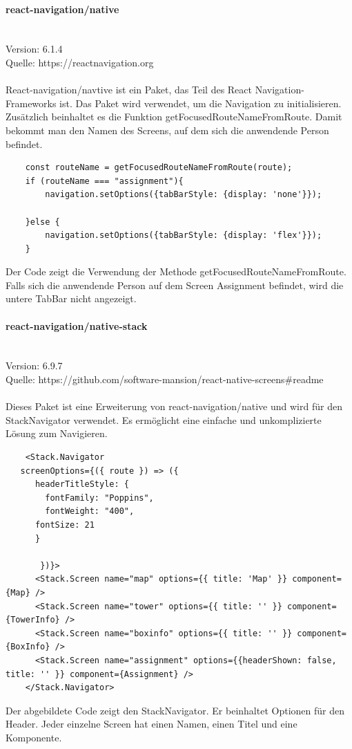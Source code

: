 \paragraph{react-navigation/native}\mbox{}\\
Version: 6.1.4\\
Quelle: https://reactnavigation.org\\ \\
React-navigation/navtive ist ein Paket, das Teil des React Navigation-Frameworks ist. Das Paket wird verwendet, um die Navigation zu initialisieren. Zusätzlich beinhaltet es die Funktion getFocusedRouteNameFromRoute. Damit bekommt man den Namen des Screens, auf dem sich die anwendende Person befindet.\\
\begin{verbatim}
    const routeName = getFocusedRouteNameFromRoute(route);
    if (routeName === "assignment"){
        navigation.setOptions({tabBarStyle: {display: 'none'}});
        
    }else {
        navigation.setOptions({tabBarStyle: {display: 'flex'}});
    }
\end{verbatim}
Der Code zeigt die Verwendung der Methode getFocusedRouteNameFromRoute. Falls sich die anwendende Person auf dem Screen Assignment befindet, wird die untere TabBar nicht angezeigt.\\


\paragraph{react-navigation/native-stack}\mbox{}\\
Version: 6.9.7\\
Quelle: https://github.com/software-mansion/react-native-screens\#readme\\ \\
Dieses Paket ist eine Erweiterung von react-navigation/native und wird für den StackNavigator verwendet. Es ermöglicht eine einfache und unkomplizierte Lösung zum Navigieren.
\begin{verbatim}
    <Stack.Navigator
   screenOptions={({ route }) => ({ 
      headerTitleStyle: {
        fontFamily: "Poppins",
        fontWeight: "400",
      fontSize: 21
      }  
      
       })}>
      <Stack.Screen name="map" options={{ title: 'Map' }} component={Map} />
      <Stack.Screen name="tower" options={{ title: '' }} component={TowerInfo} />
      <Stack.Screen name="boxinfo" options={{ title: '' }} component={BoxInfo} />
      <Stack.Screen name="assignment" options={{headerShown: false, title: '' }} component={Assignment} />
    </Stack.Navigator>
\end{verbatim}
Der abgebildete Code zeigt den StackNavigator. Er beinhaltet Optionen für den Header. Jeder einzelne Screen hat einen Namen, einen Titel und eine Komponente.\\


